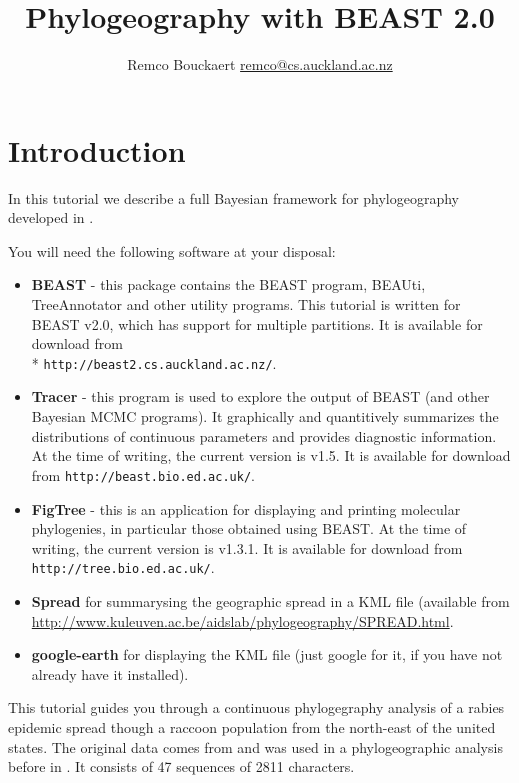 \documentclass{article}
\newcommand{\BEASTVersion}{2.0}
\newcommand{\TracerVersion}{1.5}
\newcommand{\FigTreeVersion}{1.3.1}
\begin{document}
\title{Phylogeography with BEAST 2.0}
\author{Remco Bouckaert \url{remco@cs.auckland.ac.nz}}
\maketitle

\section{Introduction}


In this tutorial we describe a full Bayesian framework for phylogeography developed in  \cite{Lemey:2009uq}.
 
You will need the following software at your disposal:

\begin{itemize}

\item {\bf BEAST} - this package contains the BEAST program, BEAUti, TreeAnnotator and other utility programs. This tutorial is written for BEAST v{\BEASTVersion}, which has support for multiple partitions. It is available for download from \\* \texttt{http://beast2.cs.auckland.ac.nz/}.
\item {\bf Tracer} - this program is used to explore the output of BEAST (and other Bayesian MCMC programs). It graphically and
quantitively summarizes the distributions of continuous parameters and provides diagnostic information. At the time of
writing, the current version is v{\TracerVersion}. It is available for download from \texttt{http://beast.bio.ed.ac.uk/}.
\item {\bf FigTree} - this is an application for displaying and printing molecular phylogenies, in particular those obtained using
BEAST. At the time of writing, the current version is v{\FigTreeVersion}. It is available for download from \texttt{http://tree.bio.ed.ac.uk/}.
\item {\bf Spread} for summarysing the geographic spread in a KML file (available from \url{http://www.kuleuven.ac.be/aidslab/phylogeography/SPREAD.html}.
\item {\bf google-earth} for displaying the KML file (just google for it, if you have not already have it installed).
\end{itemize}


This tutorial guides you through a continuous phylogegraphy analysis of a rabies epidemic spread though a raccoon population from the north-east of the united states. The original data comes from
\cite{biek:2007hi} and was used in a phylogeographic analysis before in \cite{Lemey:2010hc}. It consists of 47 sequences of 2811 characters.
\end{document}
